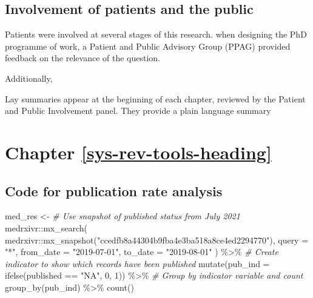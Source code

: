 \documentclass[a4paper, twoside]{templates/ociamthesis}
\newenvironment{Shaded}{\begin{snugshade}}{\end{snugshade}}
\newcommand{\AttributeTok}[1]{\textcolor[rgb]{0.77,0.63,0.00}{#1}}
\newcommand{\CommentTok}[1]{\textcolor[rgb]{0.56,0.35,0.01}{\textit{#1}}}
\newcommand{\DecValTok}[1]{\textcolor[rgb]{0.00,0.00,0.81}{#1}}
\newcommand{\FunctionTok}[1]{\textcolor[rgb]{0.00,0.00,0.00}{#1}}
\newcommand{\NormalTok}[1]{#1}
\newcommand{\OtherTok}[1]{\textcolor[rgb]{0.56,0.35,0.01}{#1}}
\newcommand{\SpecialCharTok}[1]{\textcolor[rgb]{0.00,0.00,0.00}{#1}}
\newcommand{\StringTok}[1]{\textcolor[rgb]{0.31,0.60,0.02}{#1}}
\renewenvironment{Shaded}
{
  \vspace{4pt}%
  \begin{snugshade}%
}{%
  \end{snugshade}%
  \vspace{4pt}%
}
\begin{document}
\hypertarget{appendix-ppi}{%
\subsection{Involvement of patients and the public}\label{appendix-ppi}}

Patients were involved at several stages of this research. when designing the PhD programme of work, a Patient and Public Advisory Group (PPAG) provided feedback on the relevance of the question.

Additionally,

Lay summaries appear at the beginning of each chapter, reviewed by the Patient and Public Involvement panel. They provide a plain language summary

\hypertarget{appendix-sys-rev-tools}{%
\section{Chapter \ref{sys-rev-tools-heading}}\label{appendix-sys-rev-tools}}

\hypertarget{code-for-publication-rate-analysis}{%
\subsection{Code for publication rate analysis}\label{code-for-publication-rate-analysis}}

\begin{Shaded}
\begin{Highlighting}[]
\NormalTok{med\_res }\OtherTok{\textless{}{-}}
  \CommentTok{\# Use snapshot of published status from July 2021}
\NormalTok{  medrxivr}\SpecialCharTok{::}\FunctionTok{mx\_search}\NormalTok{(}
\NormalTok{    medrxivr}\SpecialCharTok{::}\FunctionTok{mx\_snapshot}\NormalTok{(}\StringTok{"ccedfb8a44304b9fba4e3ba518a8ce4ed2294770"}\NormalTok{),}
    \AttributeTok{query =} \StringTok{"*"}\NormalTok{,}
    \AttributeTok{from\_date =} \StringTok{"2019{-}07{-}01"}\NormalTok{,}
    \AttributeTok{to\_date =} \StringTok{"2019{-}08{-}01"}
\NormalTok{  ) }\SpecialCharTok{\%\textgreater{}\%}
  \CommentTok{\# Create indicator to show which records have been published}
  \FunctionTok{mutate}\NormalTok{(}\AttributeTok{pub\_ind =} \FunctionTok{ifelse}\NormalTok{(published }\SpecialCharTok{==} \StringTok{"NA"}\NormalTok{, }\DecValTok{0}\NormalTok{, }\DecValTok{1}\NormalTok{)) }\SpecialCharTok{\%\textgreater{}\%}
  \CommentTok{\# Group by indicator variable and count}
  \FunctionTok{group\_by}\NormalTok{(pub\_ind) }\SpecialCharTok{\%\textgreater{}\%}
  \FunctionTok{count}\NormalTok{() }
\end{Highlighting}
\end{Shaded}
\end{document}
